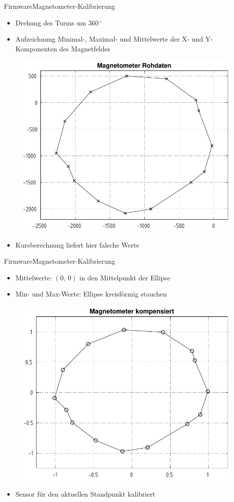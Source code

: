 \documentclass{beamer}
\begin{document}
\begin{frame}{Firmware}{Magnetometer-Kalibrierung}
    \begin{itemize}
        \item Drehung des Turms um $360\,^\circ$
        \item Aufzeichnung Minimal-, Maximal- und Mittelwerte der X- und Y-Komponenten des Magnetfeldes
    \end{itemize}
    \begin{figure}[H]
        \centering
        \includegraphics[width=.6\textwidth]{./img/qmc5883_raw.pdf}
    \end{figure}
    \begin{itemize}
        \item Kursberechnung liefert hier falsche Werte
    \end{itemize}
\end{frame}

\begin{frame}{Firmware}{Magnetometer-Kalibrierung}
    \begin{itemize}
        \item Mittelwerte: $(0,\,0)$ in den Mittelpunkt der Ellipse
        \item Min- und Max-Werte: Ellipse kreisförmig stauchen
    \end{itemize}
    \begin{figure}[H]
        \centering
        \includegraphics[width=.6\textwidth]{./img/qmc5883_compensated.pdf}
    \end{figure}
    \begin{itemize}
        \item Sensor für den aktuellen Standpunkt kalibriert
    \end{itemize}
\end{frame}
\end{document}
